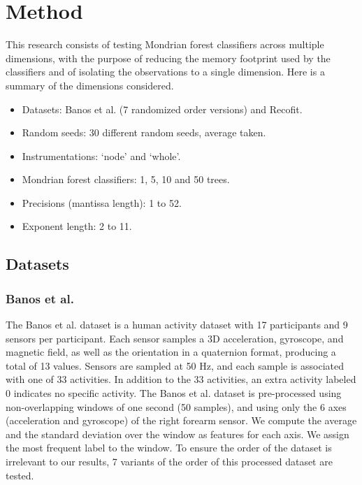 \documentclass[conference]{IEEEtran}
\begin{document}
\section{Method}

This research consists of testing Mondrian forest classifiers across multiple dimensions, with the purpose of reducing the memory footprint used by the classifiers and of isolating the observations to a single dimension. Here is a summary of the dimensions considered.
\begin{itemize}
\item Datasets: Banos et al. (7 randomized order versions) and Recofit.
\item Random seeds: 30 different random seeds, average taken.
\item Instrumentations: ‘node’ and ‘whole’.
\item Mondrian forest classifiers: 1, 5, 10 and 50 trees.
\item Precisions (mantissa length): 1 to 52.
\item Exponent length: 2 to 11.
\end{itemize}
\subsection{Datasets}
\subsubsection{Banos et al.}
The Banos et al. dataset \cite{banos2012benchmark,banos2014dealing} is a human activity dataset with 17 participants and 9 sensors per participant. Each sensor samples a 3D acceleration, gyroscope, and magnetic field, as well as the orientation in a quaternion format, producing a total of 13 values. Sensors are sampled at 50 Hz, and each sample is associated with one of 33 activities. In addition to the 33 activities, an extra activity labeled 0 indicates no specific activity. The Banos et al. dataset is pre-processed using non-overlapping windows of one second (50 samples), and using only the 6 axes (acceleration and gyroscope) of the right forearm sensor. We compute the average and the standard deviation over the window as features for each axis. We assign the most frequent label to the window. To ensure the order of the dataset is irrelevant to our results, 7 variants of the order of this processed dataset are tested.
\end{document}
